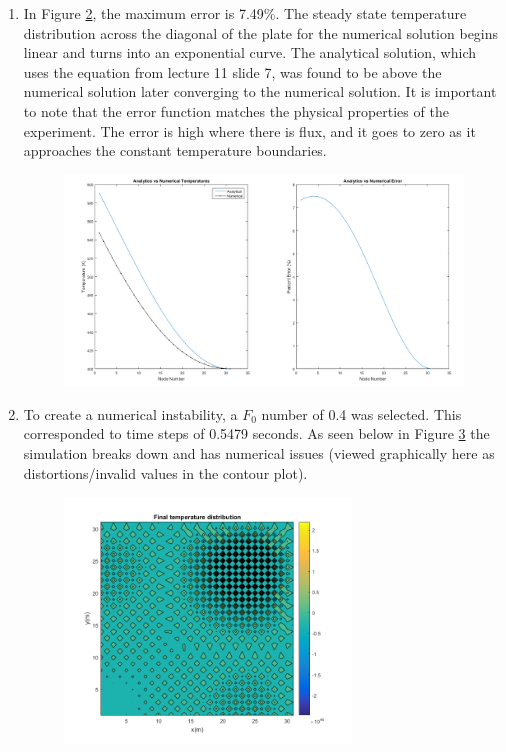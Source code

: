 \begin{enumerate}
\begin{figure}[H]
        \caption{}
        \label{fig_q6_1}
    \end{figure}
    \item In Figure \ref{fig_q7_1}, the maximum error is 7.49\%. The steady state temperature distribution across the diagonal of the plate for the numerical solution begins linear and turns into an exponential curve. The analytical solution, which uses the equation from lecture 11 slide 7, was found to be above the numerical solution later converging to the numerical solution. It is important to note that the error function matches the physical properties of the experiment. The error is high where there is flux, and it goes to zero as it approaches the constant temperature boundaries.   
    \begin{figure}[H]
        \centering
        \includegraphics[width=6in]{pictures/diag_error.png}
        \caption{}
        \label{fig_q7_1}
    \end{figure}
    \item To create a numerical instability, a $F_{0}$ number of 0.4 was selected. This corresponded to time steps of 0.5479 seconds. As seen below in Figure \ref{fig_q8_1} the simulation breaks down and has numerical issues (viewed graphically here as distortions/invalid values in the contour plot).
    \begin{figure}[H]
        \centering
        \includegraphics[width=3in]{pictures/instablity_example.png}
        \caption{}
        \label{fig_q8_1}
    \end{figure}
    
\end{enumerate}